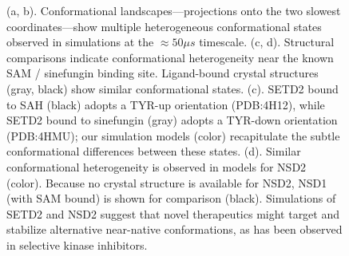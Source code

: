 \documentclass[12pt]{article}
\begin{document}
\begin{figure}
\caption{
(a, b).  Conformational landscapes---projections onto the two slowest coordinates---show multiple heterogeneous conformational states observed in simulations at the $\approx 50 \mu s$ timescale.  (c, d). Structural comparisons indicate conformational heterogeneity near the known SAM / sinefungin binding site.  Ligand-bound crystal structures (gray, black) show similar conformational states.  (c).  SETD2 bound to SAH (black) adopts a TYR-up orientation (PDB:4H12), while SETD2 bound to sinefungin (gray) adopts a TYR-down orientation (PDB:4HMU); our simulation models (color) recapitulate the subtle conformational differences between these states.  (d).  Similar conformational heterogeneity is observed in models for NSD2 (color).  Because no crystal structure is available for NSD2, NSD1 (with SAM bound) is shown for comparison (black).  Simulations of SETD2 and NSD2 suggest that novel therapeutics might target and stabilize alternative near-native conformations, as has been observed in selective kinase inhibitors.
}
\label{figure:MSM}
\end{figure}
\end{document}
